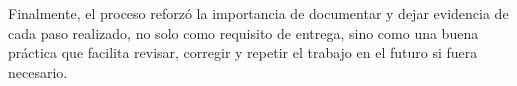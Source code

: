 \documentclass[12pt,letterpaper]{article}
\begin{document}
Finalmente, el proceso reforzó la importancia de documentar y dejar evidencia de cada paso realizado, no solo como requisito de entrega, sino como una buena práctica que facilita revisar, corregir y repetir el trabajo en el futuro si fuera necesario.


\newpage

\end{document}
